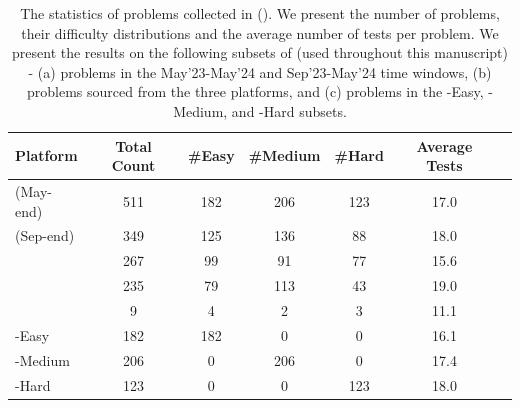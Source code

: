 \begin{table}[!t]
    \centering
    \begin{tabular}{lcccccc}
    \hline
    Platform & Total Count & \#Easy & \#Medium & \#Hard & Average Tests \\
    \hline
    \lcb{} (May-end) & 511 & 182 & 206 & 123 & 17.0 \\
    \lcb{} (Sep-end) & 349 & 125 & 136 & 88 & 18.0 \\
    \hdashline
    \atcoder{} & 267 & 99 & 91 & 77 & 15.6 \\
    \leetcode{} & 235 & 79 & 113 & 43 & 19.0 \\
    \codeforces{} & 9 & 4 & 2 & 3 & 11.1 \\
    \hdashline
    \lcb{}-Easy & 182 & 182 & 0 & 0 & 16.1 \\
    \lcb{}-Medium & 206 & 0 & 206 & 0 & 17.4 \\
    \lcb{}-Hard & 123 & 0 & 0 & 123 & 18.0 \\
    \hline
\end{tabular}
    \caption{
        The statistics of problems collected in \livecodebench{} (\lcb{}). 
        We present the number of problems, their difficulty distributions and the average number of tests per problem.
        We present the results on the following subsets of \livecodebench{} (used throughout this manuscript) - (a) problems in the  May'23-May'24 and Sep'23-May'24 time windows, (b) problems sourced from the three platforms, and (c) problems in the \lcb{}-Easy, \lcb{}-Medium, and \lcb{}-Hard subsets.}
        \label{tab:platform_comparison}
\end{table}
